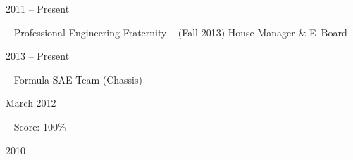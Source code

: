 

\flushleft \begin{minipage}[t]{\dateColWidth}
2011 -- Present
\end{minipage}
\begin{minipage}[t]{0.8\textwidth}
 -- Professional Engineering Fraternity -- (Fall 2013) House Manager \& E--Board 
\end{minipage}

\flushleft \begin{minipage}[t]{\dateColWidth}
2013 -- Present
\end{minipage}
\begin{minipage}[t]{0.8\textwidth}
 -- Formula SAE Team (Chassis)
\end{minipage}

\flushleft \begin{minipage}[t]{\dateColWidth}
March 2012
\end{minipage}
\begin{minipage}[t]{0.8\textwidth}
 -- Score: 100\%
\end{minipage}

\flushleft \begin{minipage}[t]{\dateColWidth}
2010
\end{minipage}
\begin{minipage}[t]{0.8\textwidth}
\end{minipage}













